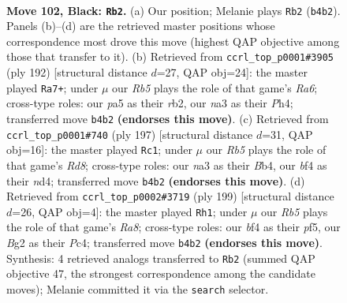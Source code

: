 \documentclass[11pt]{article}
\begin{document}
\clearpage

\begin{figure}[p]\centering
\begin{subfigure}{0.46\textwidth}\centering
\resizebox{\linewidth}{!}{%
\newchessgame
\chessboard[
  setfen={2n3K1/8/p3k3/P4p1p/1r3B2/N5P1/6b1/R7 b - - 15 102},
  showmover=false,
  pgfstyle=straightmove, color=movearrow, markmove={b4-b2}
]}
\caption{}
\end{subfigure}\hfill
\begin{subfigure}{0.46\textwidth}\centering
\resizebox{\linewidth}{!}{%
\newchessgame
\chessboard[
  setfen={8/4k3/R3b2p/5p2/7P/N3PPK1/1r6/8 w - - 31 97},
  showmover=false,
  pgfstyle=straightmove, color=movearrow, markmove={a6-a7}
]}
\caption{}
\end{subfigure}
\\[4pt]
\begin{subfigure}{0.46\textwidth}\centering
\resizebox{\linewidth}{!}{%
\newchessgame
\chessboard[
  setfen={6k1/5p2/5P2/p5P1/Pb1NK2R/8/8/3r4 b - - 19 99},
  showmover=false,
  pgfstyle=straightmove, color=movearrow, markmove={d1-c1}
]}
\caption{}
\end{subfigure}\hfill
\begin{subfigure}{0.46\textwidth}\centering
\resizebox{\linewidth}{!}{%
\newchessgame
\chessboard[
  setfen={8/6k1/5p2/4pP2/2p3P1/2N5/3B1K2/r7 b - - 55 100},
  showmover=false,
  pgfstyle=straightmove, color=movearrow, markmove={a1-h1}
]}
\caption{}
\end{subfigure}
\caption{\textbf{Move 102, Black: \texttt{Rb2}.} (a) Our position; Melanie plays \texttt{Rb2} (\texttt{b4b2}). Panels (b)--(d) are the retrieved master positions whose correspondence most drove this move (highest QAP objective among those that transfer to it). (b) Retrieved from \texttt{ccrl\_top\_p0001\#3905} (ply 192) [structural distance $d$=27, QAP obj=24]: the master played \texttt{Ra7+}; under $\mu$ our \emph{Rb5} plays the role of that game's \emph{Ra6}; cross-type roles: our \emph{p}a5 as their \emph{r}b2, our \emph{n}a3 as their \emph{P}h4; transferred move \texttt{b4b2} \textbf{(endorses this move)}. (c) Retrieved from \texttt{ccrl\_top\_p0001\#740} (ply 197) [structural distance $d$=31, QAP obj=16]: the master played \texttt{Rc1}; under $\mu$ our \emph{Rb5} plays the role of that game's \emph{Rd8}; cross-type roles: our \emph{n}a3 as their \emph{B}b4, our \emph{b}f4 as their \emph{n}d4; transferred move \texttt{b4b2} \textbf{(endorses this move)}. (d) Retrieved from \texttt{ccrl\_top\_p0002\#3719} (ply 199) [structural distance $d$=26, QAP obj=4]: the master played \texttt{Rh1}; under $\mu$ our \emph{Rb5} plays the role of that game's \emph{Ra8}; cross-type roles: our \emph{b}f4 as their \emph{p}f5, our \emph{B}g2 as their \emph{P}c4; transferred move \texttt{b4b2} \textbf{(endorses this move)}. Synthesis: 4 retrieved analogs transferred to \texttt{Rb2} (summed QAP objective 47, the strongest correspondence among the candidate moves); Melanie committed it via the \texttt{search} selector.}
\label{fig:thought-m203}
\end{figure}
\end{document}
